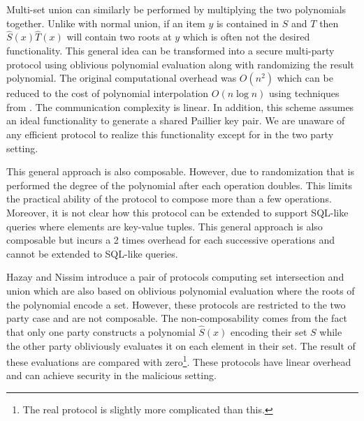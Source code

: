 \documentclass[11pt,letterpaper]{article}
\begin{document}
Multi-set union can similarly be performed by multiplying the two polynomials together. Unlike with normal union, if an item $y$ is contained in $S$ and $T$ then $\hat S(x)\hat T(x)$ will contain two roots at $y$ which is often not the desired functionality. This general idea can be transformed into a secure multi-party protocol using oblivious polynomial evaluation\cite{NP99} along with randomizing the result polynomial. The original computational overhead was $O(n^2)$ which can be reduced to the cost of polynomial interpolation $O(n\log n)$ using techniques from \cite{MF06}. The communication complexity is linear. In addition, this scheme assumes an ideal functionality to generate a shared Paillier key pair. We are unaware of any efficient protocol to realize this functionality except for \cite{RSA:HMRT12} in the two party setting.

This general approach is also composable. However, due to randomization that is performed the degree of the polynomial after each operation doubles. This limits the practical ability of the protocol to compose more than a few operations. Moreover, it is not clear how this protocol can be extended to support SQL-like queries where elements are key-value tuples. This general approach is also composable but incurs a 2 times overhead for each successive operations and cannot be extended to SQL-like queries. 
\fi


\iffullversion
Hazay and Nissim\cite{HN12} introduce a pair of protocols computing set intersection and union which are also based on oblivious polynomial evaluation where the roots of the polynomial encode a set. However, these protocols are restricted to the two party case and are not composable. The non-composability comes from the fact that only one party constructs a polynomial $\hat S(x)$ encoding their set $S$ while the other party obliviously evaluates it on each element in their set. The result of these evaluations are compared with zero\footnote{The real protocol is slightly more complicated than this.}. These protocols have linear overhead and can achieve security in the malicious setting.
\fi
\end{document}
